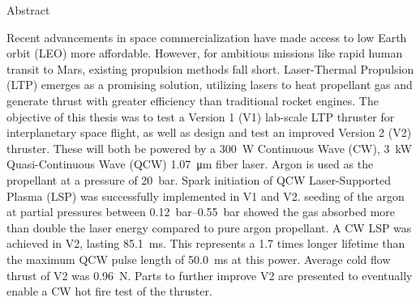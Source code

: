 \begin{plainchp}{Abstract}

    Recent advancements in space commercialization have made access to low Earth orbit (LEO) more affordable. However, for ambitious missions like rapid human transit to Mars, existing propulsion methods fall short. Laser-Thermal Propulsion (LTP) emerges as a promising solution, utilizing lasers to heat propellant gas and generate thrust with greater efficiency than traditional rocket engines. The objective of this thesis was to test a Version 1 (V1) lab-scale LTP thruster for interplanetary space flight, as well as design and test an improved Version 2 (V2) thruster. These will both be powered by a \qty{300}{W} Continuous Wave (CW), \qty{3}{kW} Quasi-Continuous Wave (QCW) \qty{1.07}{μm} fiber laser. Argon is used as the propellant at a pressure of \qty{20}{bar}. Spark initiation of QCW Laser-Supported Plasma (LSP) was successfully implemented in V1 and V2.  seeding of the argon at partial pressures between \qtyrange{.12}{.55}{bar} showed the gas absorbed more than double the laser energy compared to pure argon propellant. A CW LSP was achieved in V2, lasting \qty{85.1}{ms}. This represents a 1.7 times longer lifetime than the maximum QCW pulse length of \qty{50.0}{ms} at this power. Average cold flow thrust of V2 was \qty{0.96}{N}. Parts to further improve V2 are presented to eventually enable a CW hot fire test of the thruster.

\end{plainchp}